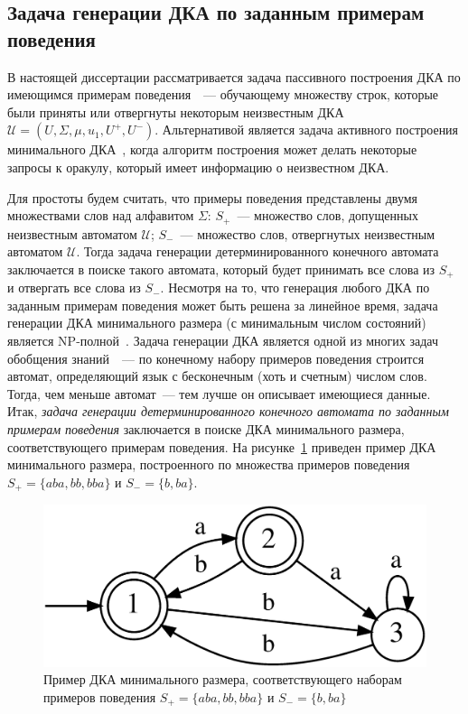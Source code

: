 \subsection{Задача генерации ДКА по заданным примерам поведения}
\label{sec:review:dfa-inf:task}

В настоящей диссертации рассматривается задача пассивного построения ДКА по имеющимся примерам поведения~\cite{DBLP:journals/pr/BugalhoO05,DBLP:journals/pr/Higuera05}~--- обучающему множеству строк, которые были приняты или отвергнуты некоторым неизвестным ДКА $\mathcal{U} = \left(U,\Sigma,\mu,u_{1},U^{+},U^{-}\right)$. 
Альтернативой является задача активного построения минимального ДКА~\cite{Angluin-active-87,DBLP:conf/sfm/SteffenHM11,neider-phd-14}, когда алгоритм построения может делать некоторые запросы к оракулу, который имеет информацию о неизвестном ДКА.

Для простоты будем считать, что примеры поведения представлены двумя множествами слов над алфавитом $\Sigma$: $S_{+}$~--- множество слов, допущенных неизвестным автоматом $\mathcal{U}$; $S_{-}$~--- множество слов, отвергнутых неизвестным автоматом $\mathcal{U}$.
Тогда задача генерации детерминированного конечного автомата заключается в поиске такого автомата, который будет принимать все слова из $S_{+}$ и отвергать все слова из $S_{-}$.
Несмотря на то, что генерация любого ДКА по заданным примерам поведения может быть решена за линейное время, задача генерации ДКА минимального размера (с минимальным числом состояний) является NP-полной~\cite{DBLP:journals/iandc/Gold78}.
Задача генерации ДКА является одной из многих задач обобщения знаний~\cite{banich2011generalization}~--- по конечному набору примеров поведения строится автомат, определяющий язык с бесконечным (хоть и счетным) числом слов.
Тогда, чем меньше автомат~--- тем лучше он описывает имеющиеся данные.
Итак, \emph{задача генерации детерминированного конечного автомата по заданным примерам поведения} заключается в поиске ДКА минимального размера, соответствующего примерам поведения.
На рисунке~\ref{img:dfa-ex} приведен пример ДКА минимального размера, построенного по множества примеров поведения $S_{+} = \{aba, bb, bba\}$ и $S_{-} = \{b, ba\}$. 

\begin{figure}[ht]
  \centering
  \includegraphics[scale=0.16]{img/datamod/FIG1.eps}
  \caption{Пример ДКА минимального размера, соответствующего наборам примеров поведения $S_{+} = \{aba, bb, bba\}$ и $S_{-} = \{b, ba\}$}
  \label{img:dfa-ex}
\end{figure}

